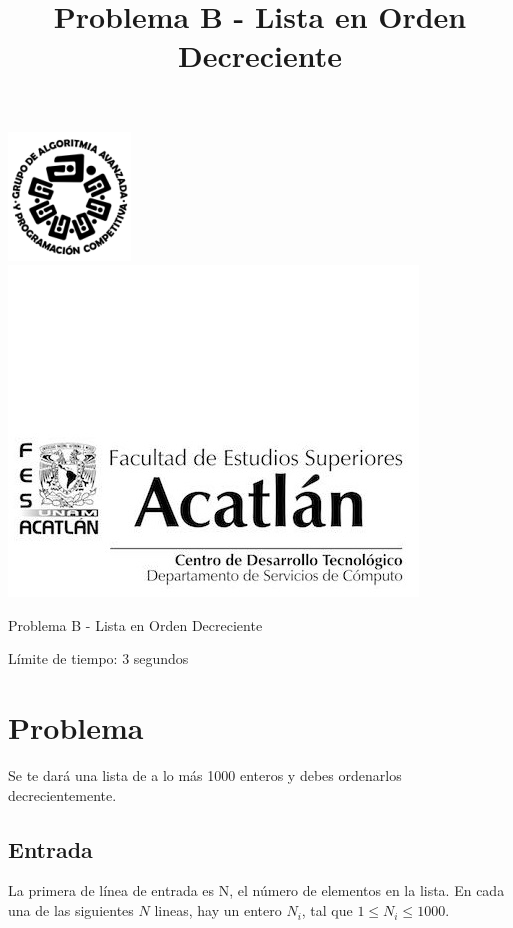 \documentclass[letter,10pt]{article}
\date{}
\begin{document}
\title{Problema B - Lista en Orden Decreciente}

\includegraphics[scale=0.6]{logo} \hspace*{9.00cm}
\includegraphics[scale=0.5]{dsc} 
\bigskip
\begin{center}
	\Large Problema B - Lista en Orden Decreciente
\end{center}

\begin{flushright}
Límite de tiempo: 3 segundos
\par\end{flushright}
\bigskip

\section*{Problema}

Se te dará una lista de a lo más 1000 enteros y debes ordenarlos 
decrecientemente.

\subsection*{Entrada}

La primera de línea de entrada es N, el número de elementos en la lista.
En cada una de las siguientes $N$ lineas, hay un entero $N_i$, tal que 
$1 \leq N_i \leq 1000$.
\end{document}
